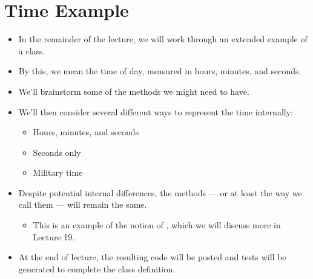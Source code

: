 \documentclass[letterpaper,10pt,english]{sphinxmanual}
\begin{document}
\section{Time Example}
\label{\detokenize{lecture_notes/lec18_classes1:time-example}}\begin{itemize}
\item {} 
In the remainder of the lecture, we will work through an extended
example of a  class.

\item {} 
By this, we mean the time of day, measured in hours, minutes, and
seconds.

\item {} 
We’ll brainstorm some of the methods we might need to have.

\item {} 
We’ll then consider several different ways to represent the time
internally:
\begin{itemize}
\item {} 
Hours, minutes, and seconds

\item {} 
Seconds only

\item {} 
Military time

\end{itemize}

\item {} 
Despite potential internal differences, the methods — or at least the
way we call them — will remain the same.
\begin{itemize}
\item {} 
This is an example of the notion of , which we will
discuss more in Lecture 19.

\end{itemize}

\item {} 
At the end of lecture, the resulting code will be posted and
tests will be generated to complete the class definition.

\end{itemize}
\end{document}

